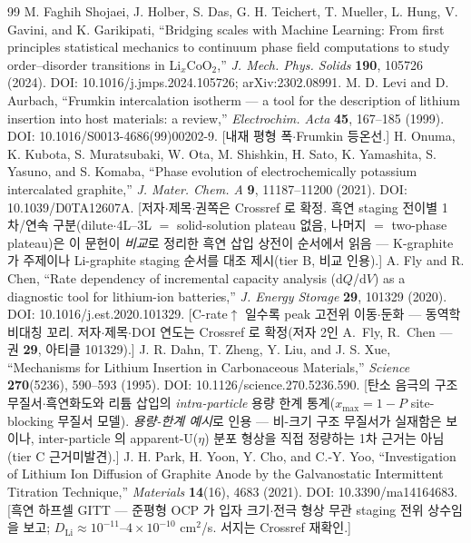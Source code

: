 \begin{thebibliography}{99}
 M. Faghih Shojaei, J. Holber, S. Das, G. H. Teichert, T. Mueller, L. Hung, V. Gavini, and K. Garikipati, ``Bridging scales with Machine Learning: From first principles statistical mechanics to continuum phase field computations to study order--disorder transitions in Li$_x$CoO$_2$,'' \emph{J. Mech. Phys. Solids} \textbf{190}, 105726 (2024). DOI: 10.1016/j.jmps.2024.105726; arXiv:2302.08991.
 M. D. Levi and D. Aurbach, ``Frumkin intercalation isotherm --- a tool for the description of lithium insertion into host materials: a review,'' \emph{Electrochim. Acta} \textbf{45}, 167--185 (1999). DOI: 10.1016/S0013-4686(99)00202-9. [내재 평형 폭$\cdot$Frumkin 등온선.]
 H. Onuma, K. Kubota, S. Muratsubaki, W. Ota, M. Shishkin, H. Sato, K. Yamashita, S. Yasuno, and S. Komaba, ``Phase evolution of electrochemically potassium intercalated graphite,'' \emph{J. Mater. Chem. A} \textbf{9}, 11187--11200 (2021). DOI: 10.1039/D0TA12607A. [저자$\cdot$제목$\cdot$권쪽은 Crossref 로 확정. 흑연 staging 전이별 1차/연속 구분(dilute$\cdot$4L--3L $=$ solid-solution plateau 없음, 나머지 $=$ two-phase plateau)은 이 문헌이 \emph{비교}로 정리한 흑연 삽입 상전이 순서에서 읽음 --- K-graphite 가 주제이나 Li-graphite staging 순서를 대조 제시(tier B, 비교 인용).]
 A. Fly and R. Chen, ``Rate dependency of incremental capacity analysis (d$Q$/d$V$) as a diagnostic tool for lithium-ion batteries,'' \emph{J. Energy Storage} \textbf{29}, 101329 (2020). DOI: 10.1016/j.est.2020.101329. [C-rate$\uparrow$ 일수록 peak 고전위 이동$\cdot$둔화 --- 동역학 비대칭 꼬리. 저자$\cdot$제목$\cdot$DOI 연도는 Crossref 로 확정(저자 2인 A.~Fly, R.~Chen --- 권 \textbf{29}, 아티클 101329).]
 J. R. Dahn, T. Zheng, Y. Liu, and J. S. Xue, ``Mechanisms for Lithium Insertion in Carbonaceous Materials,'' \emph{Science} \textbf{270}(5236), 590--593 (1995). DOI: 10.1126/science.270.5236.590. [탄소 음극의 구조 무질서$\cdot$흑연화도와 리튬 삽입의 \emph{intra-particle} 용량 한계 통계($x_{\max}=1-P$ site-blocking 무질서 모델). \emph{용량-한계 예시}로 인용 --- 비-크기 구조 무질서가 실재함은 보이나, inter-particle 의 apparent-U($\eta$) 분포 형상을 직접 정량하는 1차 근거는 아님(tier C 근거미발견).]
 J. H. Park, H. Yoon, Y. Cho, and C.-Y. Yoo, ``Investigation of Lithium Ion Diffusion of Graphite Anode by the Galvanostatic Intermittent Titration Technique,'' \emph{Materials} \textbf{14}(16), 4683 (2021). DOI: 10.3390/ma14164683. [흑연 하프셀 GITT --- 준평형 OCP 가 입자 크기$\cdot$전극 형상 무관 staging 전위 상수임을 보고; $D_\mathrm{Li}\approx10^{-11}$--$4\times10^{-10}$ cm$^2$/s. 서지는 Crossref 재확인.]

\end{thebibliography}
